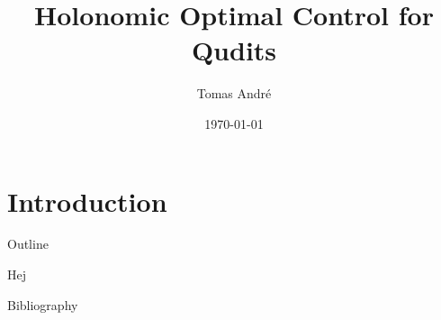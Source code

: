 \documentclass{beamer}
\title[Holonomic Optimal Control for Qudits]{Holonomic Optimal Control for Qudits}
\author{ Tomas André }
\institute{ Uppsala University }
\date{\today}
\begin{document}
\begin{frame}
  \titlepage
\end{frame}






\section{Introduction}

\begin{frame}{Outline}
\tableofcontents
\end{frame}

\begin{frame}
Hej
\end{frame}



\begin{frame}{Bibliography}
\end{frame}
\end{document}
